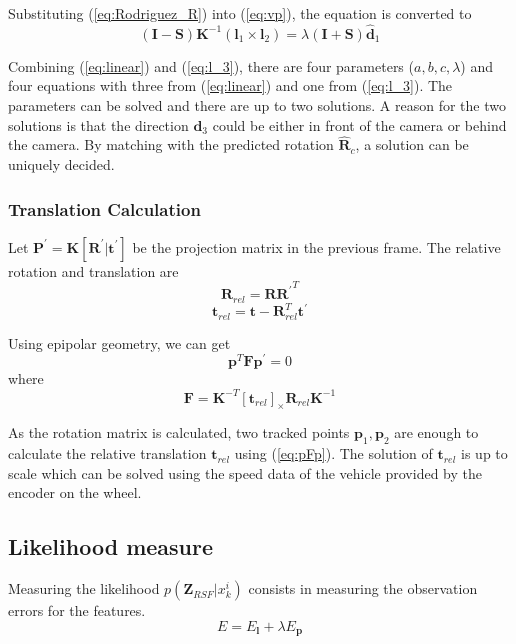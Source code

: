 \documentclass[letterpaper, 10 pt, conference]{ieeeconf}  %
\begin{document}
Substituting (\ref{eq:Rodriguez_R}) into (\ref{eq:vp}), the equation is converted to
\begin{equation}
(\mathbf{I}-\mathbf{S})\mathbf{K}^{-1}(\mathbf{l}_1\times \mathbf{l}_2)
= \lambda (\mathbf{I}+\mathbf{S})\hat{\mathbf{d}}_1
\label{eq:linear}
\end{equation}

Combining (\ref{eq:linear}) and (\ref{eq:l_3}), there are four parameters ($a,b,c,\lambda$) and four equations with three from (\ref{eq:linear}) and one from (\ref{eq:l_3}). The parameters can be solved and there are up to two solutions.  A reason for the two solutions is that the direction $\mathbf{d}_3$ could be either in front of the camera or behind the camera. By matching with the predicted rotation $\hat{\mathbf{R}}_c$, a solution can be uniquely decided.

\subsubsection{Translation Calculation}
Let $\mathbf{P}^\prime=\mathbf{K}[\mathbf{R}^\prime|\mathbf{t}^\prime]$ be the projection matrix in the previous frame. The relative rotation and translation are
\begin{equation}
\mathbf{R}_{rel} = \mathbf{R} {\mathbf{R}^\prime}^T
\end{equation}
\begin{equation}
\mathbf{t}_{rel}=\mathbf{t} - \mathbf{R}_{rel}^T \mathbf{t}^\prime
\end{equation}

Using epipolar geometry, we can get
\begin{equation}
\mathbf{p}^T \mathbf{F} \mathbf{p}^\prime=0
\label{eq:pFp}
\end{equation}
where
\begin{equation}
\mathbf{F} = \mathbf{K}^{-T} {\left[\mathbf{t}_{rel}\right]}_\times \mathbf{R}_{rel} \mathbf{K}^{-1}
\label{eq:F}
\end{equation}

As the rotation matrix is calculated, two tracked points $\mathbf{p}_1,\mathbf{p}_2$ are enough to calculate the relative translation $\mathbf{t}_{rel}$ using (\ref{eq:pFp}). The solution of $\mathbf{t}_{rel}$ is up to scale which can be solved using the speed data of the vehicle provided by the encoder on the wheel.

\subsection{Likelihood measure}
Measuring the likelihood $p(\mathbf{Z}_{RSF} | x_k^i)$ consists in measuring the observation errors for the features.
\begin{equation}
E= E_\mathbf{l} + \lambda E_\mathbf{p}
\end{equation}
\end{document}
